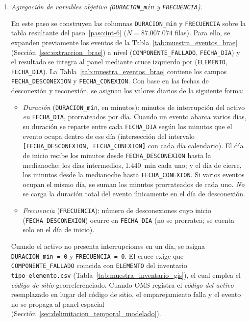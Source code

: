 {\begin{enumerate}
        \item\label{paso:int-7} \textit{Agregación de variables objetivo (\texttt{DURACION\_min} y \texttt{FRECUENCIA}).}\mbox{}\par\vspace{0.2em}\noindent
        En este paso se construyen las columnas \texttt{DURACION\_min} y \texttt{FRECUENCIA} sobre la tabla resultante del paso~\ref{paso:int-6} ($N = 87{.}007{.}074$ filas). Para ello, se expanden previamente los eventos de la Tabla~\ref{tab:muestra_eventos_brae} (Sección~\ref{sec:extraccion_brae}) a nivel (\texttt{COMPONENTE\_FALLADO}, \texttt{FECHA\_DIA}) y el resultado se integra al panel mediante cruce izquierdo por (\texttt{ELEMENTO}, \texttt{FECHA\_DIA}). La Tabla~\ref{tab:muestra_eventos_brae} contiene los campos \texttt{FECHA\_DESCONEXION} y \texttt{FECHA\_CONEXION}. Con base en las fechas de desconexión y reconexión, se asignan los valores diarios de la siguiente forma:
        \begin{itemize}
            \item \textit{Duración} (\texttt{DURACION\_min}, en minutos): minutos de interrupción del activo \textit{en} \texttt{FECHA\_DIA}, prorrateados por día. Cuando un evento abarca varios días, su duración se reparte entre cada \texttt{FECHA\_DIA} según los minutos que el evento ocupa dentro de ese día (intersección del intervalo \texttt{[FECHA\_DESCONEXION, FECHA\_CONEXION]} con cada día calendario). El día de inicio recibe los minutos desde \texttt{FECHA\_DESCONEXION} hasta la medianoche; los días intermedios, $1{.}440$~min cada uno; y el día de cierre, los minutos desde la medianoche hasta \texttt{FECHA\_CONEXION}. Si varios eventos ocupan el mismo día, se suman los minutos prorrateados de cada uno. \textit{No} se carga la duración total del evento únicamente en el día de desconexión.
            \item \textit{Frecuencia} (\texttt{FRECUENCIA}): número de desconexiones cuyo inicio (\texttt{FECHA\_DESCONEXION}) ocurre en \texttt{FECHA\_DIA} (no se prorratea; se cuenta solo en el día de inicio).
        \end{itemize}
        \noindent Cuando el activo no presenta interrupciones en un día, se asigna \texttt{DURACION\_min = 0} y \texttt{FRECUENCIA = 0}. El cruce exige que \texttt{COMPONENTE\_FALLADO} coincida con \texttt{ELEMENTO} del inventario \texttt{tipo\_elemento.csv} (Tabla~\ref{tab:muestra_inventario_gis}), el cual emplea el \textit{código de sitio} georreferenciado. Cuando OMS registra el \textit{código del activo} reemplazado en lugar del código de sitio, el emparejamiento falla y el evento no se propaga al panel espacial (Sección~\ref{sec:delimitacion_temporal_modelado}).
    

\end{enumerate}}
